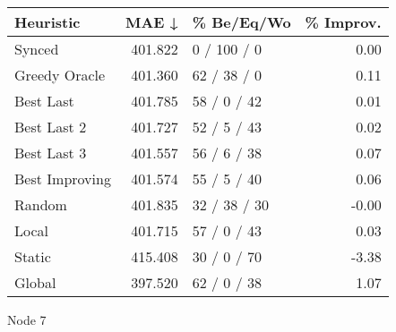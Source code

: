 \begin{tabular}{lrlr}
\toprule
\textbf{Heuristic} & \textbf{MAE ↓} & \textbf{\% Be/Eq/Wo} & \textbf{\% Improv.} \\
\midrule
            Synced &        401.822 &          0 / 100 / 0 &                0.00 \\
     Greedy Oracle &        401.360 &          62 / 38 / 0 &                0.11 \\
         Best Last &        401.785 &          58 / 0 / 42 &                0.01 \\
       Best Last 2 &        401.727 &          52 / 5 / 43 &                0.02 \\
       Best Last 3 &        401.557 &          56 / 6 / 38 &                0.07 \\
    Best Improving &        401.574 &          55 / 5 / 40 &                0.06 \\
            Random &        401.835 &         32 / 38 / 30 &               -0.00 \\
             Local &        401.715 &          57 / 0 / 43 &                0.03 \\
            Static &        415.408 &          30 / 0 / 70 &               -3.38 \\
            Global &        397.520 &          62 / 0 / 38 &                1.07 \\
\bottomrule
\end{tabular}
\caption{Node 7}
\label{tab:iid_lr01_le1_bs4_7}
